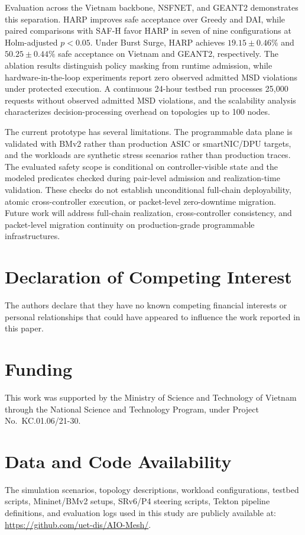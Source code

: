 \documentclass[final,5p]{elsarticle}
\newcommand{\rev}[1]{\textcolor{BrickRed}{#1}}
\begin{document}
\rev{Evaluation across the Vietnam backbone, NSFNET, and GEANT2 demonstrates this separation. HARP improves safe acceptance over Greedy and DAI, while paired comparisons with SAF-H favor HARP in seven of nine configurations at Holm-adjusted \(p<0.05\). Under Burst Surge, HARP achieves $19.15\pm0.46\%$ and $50.25\pm0.44\%$ safe acceptance on Vietnam and GEANT2, respectively. The ablation results distinguish policy masking from runtime admission, while hardware-in-the-loop experiments report zero observed admitted MSD violations under protected execution. A continuous 24-hour testbed run processes 25,000 requests without observed admitted MSD violations, and the scalability analysis characterizes decision-processing overhead on topologies up to 100 nodes.}

The current prototype has several limitations. The programmable data plane is validated with BMv2 rather than production ASIC or smartNIC/DPU targets, and the workloads are synthetic stress scenarios rather than production traces. \rev{The evaluated safety scope is conditional on controller-visible state and the modeled predicates checked during pair-level admission and realization-time validation. These checks do not establish unconditional full-chain deployability, atomic cross-controller execution, or packet-level zero-downtime migration.} Future work will address full-chain realization, cross-controller consistency, and packet-level migration continuity \rev{on production-grade programmable infrastructures}.

\section*{Declaration of Competing Interest}
The authors declare that they have no known competing financial interests or personal relationships that could have appeared to influence the work reported in this paper.

\section*{Funding} 
\noindent This work was supported by the Ministry of Science and Technology of Vietnam through the National Science and Technology Program, under Project No.~KC.01.06/21-30.

\section*{Data and Code Availability}
The simulation scenarios, topology descriptions, workload configurations, testbed scripts, Mininet/BMv2 setups, SRv6/P4 steering scripts, Tekton pipeline definitions, and evaluation logs used in this study are publicly available at:
\url{https://github.com/uet-dis/AIO-Mesh/}.
\end{document}
